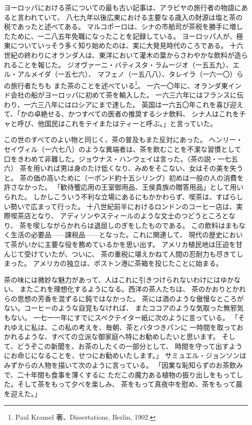 \documentclass[a4paper, platex, dvipdfmx]{jsarticle}
\begin{document}
ヨーロッパにおける茶についての最も古い記事は、アラビヤの旅行者の物語にあると言われていて、
八七九年以後広東における主要なる歳入の財源は塩と茶の税であったと述べてある。
マルコポーロは、シナの市舶司が茶税を勝手に増したために、一二八五年免職になったことを記録している。
ヨーロッパ人が、極東についていっそう多く知り始めたのは、実に大発見時代のころである。
十六世紀の終わりにオランダ人は、東洋において灌木の葉からさわやかな飲料が造られることを報じた。
ジオヴァーニ・バティスタ・ラムージオ（一五五九）、エル・アルメイダ（一五七六）、
マフェノ（一五八八）、タレイラ（一六一〇）らの旅行者たちも
また茶のことを述べている\footnote{Paul Kransel 著、Dissertations, Berlin, 1902.}。
一六一〇年に、オランダ東インド会社の船がヨーロッパに初めて茶を輸入した。
一六三六年にはフランスに伝わり、一六三八年にはロシアにまで達した。
英国は一六五〇年これを喜び迎えて、「かの卓絶せる、かつすべての医者の推奨するシナ飲料、
シナ人はこれをチャと呼び、他国民はこれをテイまたはティーと呼ぶ。」と言っていた。

この世のすべてのよい物と同じく、茶の普及もまた反対にあった。
ヘンリー・セイヴィル（一六七八）のような異端者は、茶を飲むことを不潔な習慣として
口をきわめて非難した。ジョウナス・ハンウェイは言った。（茶の説・一七五六）
茶を用いれば男は身のたけ低くなり、みめをそこない、女はその美を失うと。
茶の価の高いために（一ポンド約十五シリング）初めは一般の人の消費を許さなかった。
「歓待饗応用の王室御用品、王侯貴族の贈答用品」として用いられた。
しかしこういう不利な立場にあるにもかかわらず、喫茶は、すばらしい勢いで広まって行った。
十八世紀前半におけるロンドンのコーヒー店は、実際喫茶店となり、
アディソンやスティールのような文士のつどうところとなり、
茶を喫しながらかれらは退屈しのぎをしたものである。
この飲料はまもなく生活の必要品——課税品——となった。これに関連して、
現代の歴史において茶がいかに主要な役を務めているかを思い出す。
アメリカ植民地は圧迫を甘んじて受けていたが、ついに、
茶の重税に堪えかねて人間の忍耐力も尽きてしまった。
アメリカの独立は、ボストン港に茶箱を投じたことに始まる。

茶の味には微妙な魅力があって、人はこれに引きつけられないわけにはゆかない、
またこれを理想化するようになる。西洋の茶人たちは、
茶のかおりとかれらの思想の芳香を混ずるに鈍ではなかった。
茶には酒のような傲慢なところがない。コーヒーのような自覚もなければ、
またココアのような気取った無邪気もない。
一七一一年にすでにスペクテイター紙に次のように言っている。
「それゆえに私は、この私の考えを、毎朝、茶とバタつきパンに
一時間を取っておかれるような、すべての立派な御家庭へ特にお勧めしたいと思います。
そして、どうぞこの新聞を、お茶のしたくの一部分として、
時間を守って出すようにお命じになることを、せつにお勧めいたします。」
サミュエル・ジョンソンはみずからの人物を描いて次のように言っている。
「因業な恥知らずのお茶飲みで、二十年間も食事を薄くするに
ただこの魔力ある植物の振り出しをもってした。そして茶をもって夕べを楽しみ、
茶をもって真夜中を慰め、茶をもって晨を迎えた。」
\end{document}
